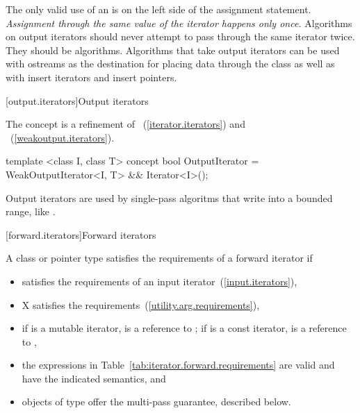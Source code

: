
\pnum
\enternote
The only valid use of an
is on the left side of the assignment statement.
\textit{Assignment through the same value of the iterator happens only once.}
Algorithms on output iterators should never attempt to pass through the same iterator twice.
They should be
algorithms.
Algorithms that take output iterators can be used with ostreams as the destination
for placing data through the
class as well as with insert iterators and insert pointers.
\exitnote

\begin{addedblock}
[output.iterators]{Output iterators}

\pnum
The  concept is a refinement of ~(\ref{iterator.iterators}) and
~(\ref{weakoutput.iterators}).

\begin{codeblock}
template <class I, class T>
concept bool OutputIterator =
  WeakOutputIterator<I, T> && Iterator<I>();
\end{codeblock}

\pnum
\enternote Output iterators are used by single-pass
algoritms that write into a bounded range, like .
\exitnote

\end{addedblock}

[forward.iterators]{Forward iterators}

\begin{removedblock}
\pnum
A class or pointer type
satisfies the requirements of a forward iterator if

\begin{itemize}
\item {} satisfies the requirements of an input iterator~(\ref{input.iterators}),

\item X satisfies the 
requirements~(\ref{utility.arg.requirements}),

\item if  is a mutable iterator,  is a reference to ;
if  is a const iterator,  is a reference to ,

\item the expressions in Table~\ref{tab:iterator.forward.requirements}
are valid and have the indicated semantics, and

\item objects of type  offer the multi-pass guarantee, described below.
\end{itemize}
\end{removedblock}

